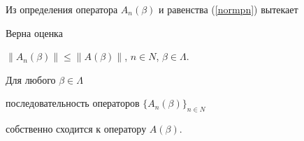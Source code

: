 Из определения оператора $A_n(\beta)$ и равенства (\ref{normpn}) вытекает





\begin{lem}


\label{est-An}


Верна оценка 


$\|A_n(\beta)\| \le \|A(\beta)\|$, $n \in N$, $\beta \in \Lambda$.


\end{lem}





\begin{lem}


\label{Cond4}


Для любого $\beta \in \Lambda$ 


последовательность операторов $\{A_n(\beta)\}_{n\in N}$


собственно сходится к оператору $A(\beta)$.


\end{lem}





